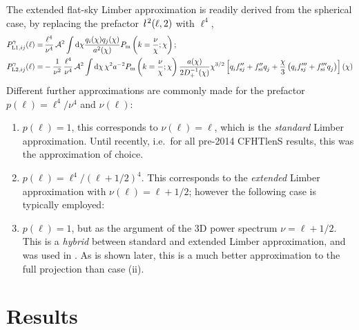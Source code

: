 \documentclass[fleqn,usenatbib]{mnras} %
\newcommand{\ellbar}{\hbox{\it \l}\,}
\newcommand{\pref}{{\cal A}}
\begin{document}
The extended flat-sky Limber approximation is readily derived from the
spherical case, by replacing the prefactor $\ellbar^2(\ell, 2)$ with $\ell^4$,
%
\begin{align}
  P^\gamma_{{\rm L1}, ij}(\ell) = & \, \frac{\ell^4}{\nu^4} \, \pref^2 \int {\rm d} \chi \frac{ q_i(\chi) q_j(\chi) }{a^2(\chi)}
  P_{\rm m}\left(k = \frac{\nu}{\chi}; \chi\right);
  \label{eq:P_ell_limber1}
  \\
    P^\gamma_{{\rm L2}, ij}(\ell) = & - \frac 1 {\nu^2} \, \frac{\ell^4}{\nu^4} \, \pref^2
    \int {\rm d} \chi \, \chi^{2} a^{-2} P_{\rm m}\left(k = \frac\nu\chi; \chi\right)
    \frac{a(\chi)}{2 D^{-1}_+(\chi)} \chi^{3/2} \left[ q^{}_i f^{\prime\prime}_{{\rm s}j} + f^{\prime\prime}_{{\rm s}i} q^{}_j  
      + \frac{\chi}{3} \left( q^{}_i f^{\prime\prime\prime}_{{\rm s}j} + f^{\prime\prime\prime}_{{\rm s}i} q^{}_j
      \right)
    \right](\chi)
  \label{eq:P_ell_limber2}
\end{align}
%
Different further approximations are commonly made for the prefactor $p(\ell) = \ell^4/\nu^4$ and $\nu(\ell)$:
%
\begin{enumerate}
  \item $p(\ell) = 1$, this corresponds to $\nu(\ell) = \ell$, which is the \emph{standard} Limber approximation.
    Until recently, i.e.~for all pre-2014 CFHTlenS results, this was the approximation of choice.
  \item $p(\ell) = \ell^4/(\ell + 1/2)^4$. This corresponds to the \emph{extended} Limber
    approximation with $\nu(\ell) = \ell + 1/2$; however the following case is typically employed:
  \item $p(\ell) = 1$, but as the argument of the 3D power spectrum $\nu = \ell + 1/2$. This is
    a \emph{hybrid} between
    standard and extended Limber approximation, and was used in \cite{KiDS-450,joudaki/etal:2016}. As is shown
    later, this is a much better approximation to the full projection than case (ii).
\end{enumerate}


\section{Results}
\label{sec:results}
\end{document}
